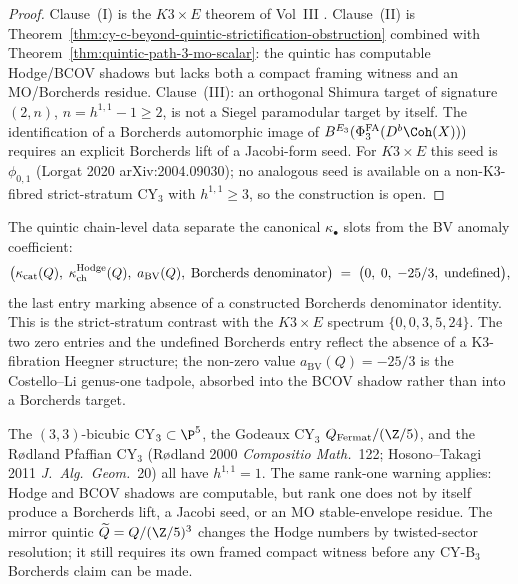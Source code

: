 \begin{proof}
Clause~(I) is the $K3 \times E$ theorem of
Vol~III \cite{VolI}. Clause~(II)
is Theorem~\ref{thm:cy-c-beyond-quintic-strictification-obstruction}
combined with Theorem~\ref{thm:quintic-path-3-mo-scalar}: the quintic
has computable Hodge/BCOV shadows but lacks both a compact framing
witness and an MO/Borcherds residue. Clause~(III): an orthogonal
Shimura target of signature \((2,n)\), \(n=h^{1,1}-1\geq2\), is not a
Siegel paramodular target by itself. The identification of a
Borcherds automorphic image of
\(B^{E_3}(\Phi_3^{\mathrm{FA}}(D^b\Coh(X)))\) requires an explicit
Borcherds lift of a Jacobi-form seed. For \(K3 \times E\) this seed is
$\phi_{0, 1}$ (Lorgat 2020 arXiv:2004.09030); no analogous seed is
available on a non-K3-fibred strict-stratum CY$_3$ with $h^{1, 1}
\geq 3$, so the construction is open.
\end{proof}

\begin{remark}
\label{rem:quintic-four-kappa-spectrum}
The quintic chain-level data separate the canonical $\kappa_\bullet$
slots from the BV anomaly coefficient:
\[
 \bigl(\kappa_{\mathrm{cat}}(Q),\; \kappa_{\mathrm{ch}}^{\mathrm{Hodge}}(Q),\;
 a_{\mathrm{BV}}(Q),\; \textup{Borcherds denominator}\bigr)
 \;=\; \bigl(0,\; 0,\; -25/3,\; \mathrm{undefined}\bigr),
\]
the last entry marking absence of a constructed Borcherds denominator
identity. This is the strict-stratum contrast with
the $K3 \times E$ spectrum $\{0, 0, 3, 5, 24\}$. The two zero entries and
the undefined Borcherds entry reflect the absence of a K3-fibration
Heegner structure; the non-zero value $a_{\mathrm{BV}}(Q)
= -25/3$ is the Costello--Li genus-one tadpole, absorbed into the
BCOV shadow rather than into a Borcherds target.
\end{remark}

\begin{remark}
\label{rem:quintic-other-rank-1-cy3}
The $(3, 3)$-bicubic CY$_3 \subset \P^5$, the Godeaux CY$_3$
$Q_{\mathrm{Fermat}}/(\Z/5)$, and the R{\o}dland Pfaffian CY$_3$
(R{\o}dland 2000 \emph{Compositio Math.}~122; Hosono--Takagi 2011
\emph{J.\ Alg.\ Geom.}~20) all have $h^{1, 1} = 1$. The same
rank-one warning applies: Hodge and BCOV shadows are computable, but
rank one does not by itself produce a Borcherds lift, a Jacobi seed, or
an MO stable-envelope residue. The mirror quintic
$\widetilde Q = Q/(\Z/5)^3$ changes the Hodge numbers by twisted-sector
resolution; it still requires its own framed compact witness before any
CY-B$_3$ Borcherds claim can be made.
\end{remark}

